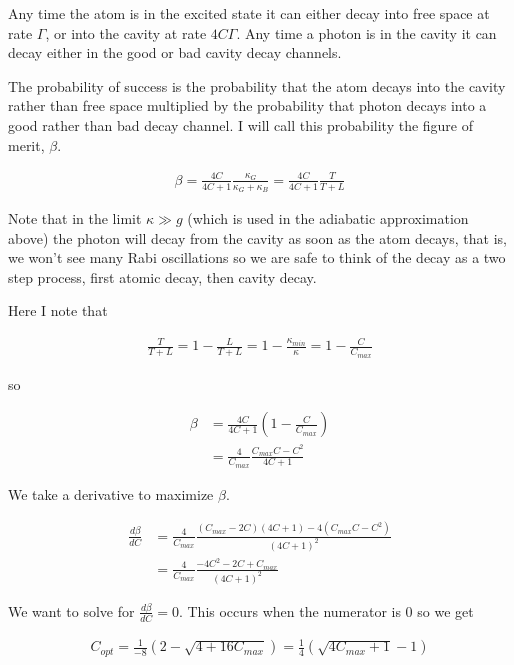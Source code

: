 \documentclass[12pt]{article}
\begin{document}
Any time the atom is in the excited state it can either decay into free space at rate $\Gamma$, or into the cavity at rate $4C \Gamma$. Any time a photon is in the cavity it can decay either in the good or bad cavity decay channels.

The probability of success is the probability that the atom decays into the cavity rather than free space multiplied by the probability that photon decays into a good rather than bad decay channel. I will call this probability the figure of merit, $\beta$.

\begin{align}
\beta = \frac{4C}{4C+1} \frac{\kappa_G}{\kappa_G+\kappa_B} = \frac{4C}{4C+1} \frac{T}{T+L}
\end{align}

Note that in the limit $\kappa \gg g$ (which is used in the adiabatic approximation above) the photon will decay from the cavity as soon as the atom decays, that is, we won't see many Rabi oscillations so we are safe to think of the decay as a two step process, first atomic decay, then cavity decay.

Here I note that

\begin{align}
\frac{T}{T+L} = 1- \frac{L}{T+L} = 1-\frac{\kappa_{min}}{\kappa} = 1 - \frac{C}{C_{max}}
\end{align}

so

\begin{align}
\beta &= \frac{4C}{4C+1}\left(1-\frac{C}{C_{max}}\right)\\
&= \frac{4}{C_{max}} \frac{C_{max} C - C^2}{4C+1}
\end{align}

We take a derivative to maximize $\beta$.

\begin{align}
\frac{d\beta}{dC} &= \frac{4}{C_{max}}\frac{(C_{max}-2C)(4C+1) - 4(C_{max}C-C^2)}{(4C+1)^2}\\
&= \frac{4}{C_{max}} \frac{-4 C^2 - 2 C + C_{max}}{(4C+1)^2}
\end{align}

We want to solve for $\frac{d\beta}{dC} = 0$. This occurs when the numerator is $0$ so we get

\begin{align}
C_{opt} = \frac{1}{-8} \left(2 - \sqrt{4 + 16 C_{max}}\right) = \frac{1}{4}\left(\sqrt{4C_{max}+1} - 1 \right)
\end{align}
\end{document}
